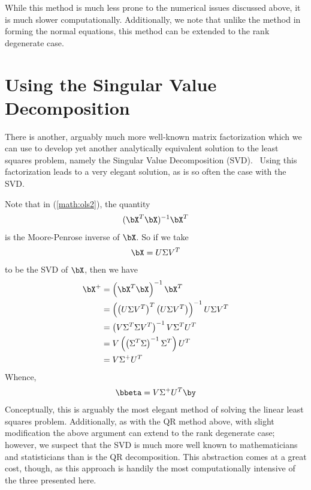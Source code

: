 While this method is much less prone to the numerical issues discussed above, it is much slower computationally.  Additionally, we note that unlike the method in forming the normal equations, this method can be extended to the rank degenerate case.




\section{Using the Singular Value Decomposition}
There is another, arguably much more well-known matrix factorization which we can use to develop yet another analytically equivalent solution to the least squares problem, namely the Singular Value Decomposition
(SVD).~  Using this factorization leads to a very elegant solution, as is so often the case with the SVD.  

Note that in (\ref{math:ols2}), the quantity
\begin{align*}
(\bX^T\bX)^{-1}\bX^T
\end{align*}
is the Moore-Penrose inverse of $\bX$.  So if we take
\begin{align*}
\bX = U\Sigma V^T
\end{align*}
to be the SVD of $\bX$, then we have
\begin{align*}
\bX^+ &= \left(\bX^T\bX\right)^{-1}\bX^T\\
  &= \left( \left(U\Sigma V^T\right)^T \left(U\Sigma V^T\right) \right)^{-1} U\Sigma V^T\\
  &= \left( V\Sigma^T\Sigma V^T \right)^{-1} V\Sigma^T U^T\\
  &= V \left( \left(\Sigma^T\Sigma\right)^{-1} \Sigma^T \right) U^T\\
  &= V \Sigma^+ U^T
\end{align*}
Whence,
\begin{align*}
\bbeta = V\Sigma^+ U^T\by
\end{align*}
Conceptually, this is arguably the most elegant method of solving the linear least squares problem.  Additionally, as with the QR method above, with slight modification the above argument can extend to the rank degenerate case; however, we suspect that the SVD is much more well known to mathematicians and statisticians than is the QR decomposition.  This abstraction comes at a great cost, though, as this approach is handily the most computationally intensive of the three presented here.




